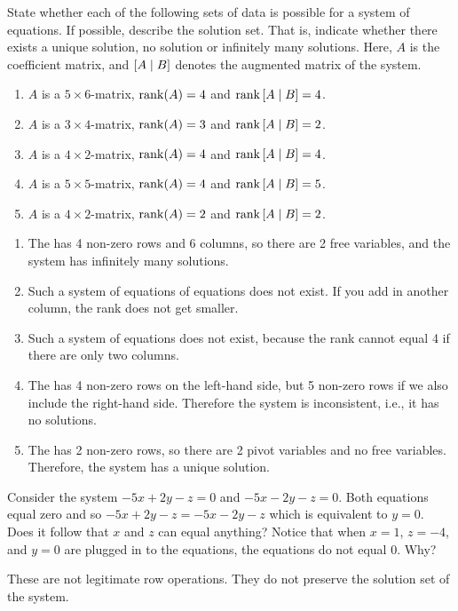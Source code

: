 \begin{ex}
  State whether each of the following sets of data is
  possible for a system of equations. If possible, describe the
  solution set.  That is, indicate whether there exists a unique
  solution, no solution or infinitely many solutions. Here, $A$ is
  the coefficient matrix, and $\left[A\mid B\right]$ denotes the
  augmented matrix of the system.

  \begin{enumerate}
  \item $A$ is a $5\times 6$-matrix, $\rank(A) =4$ and
    $\rank\mat{A\mid B} =4$.

  \item $A$ is a $3\times 4$-matrix, $\rank(A) =3$ and
    $\rank\mat{A\mid B} =2$.

  \item $A$ is a $4\times 2$-matrix, $\rank(A) =4$ and
    $\rank\mat{A\mid B} =4$.

  \item $A$ is a $5\times 5$-matrix, $\rank(A) =4$ and
    $\rank\mat{A\mid B} =5$.

  \item $A$ is a $4\times 2$-matrix, $\rank(A) =2$ and
    $\rank\mat{A\mid B} =2$.
  \end{enumerate}

  \begin{sol}
    \begin{enumerate}
    \item The {\ef} has 4 non-zero rows and 6 columns, so there are 2
      free variables, and the system has infinitely many solutions.
    \item Such a system of equations of equations does not exist. If
      you add in another column, the rank does not get smaller.
    \item Such a system of equations does not exist,
      because the rank cannot equal 4 if there are only two columns.
    \item The {\ef} has 4 non-zero rows on the left-hand side, but 5
      non-zero rows if we also include the right-hand side. Therefore
      the system is inconsistent, i.e., it has no solutions.
    \item The {\ef} has 2 non-zero rows, so there are 2
      pivot variables and no free variables. Therefore, the system has
      a unique solution.
    \end{enumerate}
  \end{sol}
\end{ex}

\begin{ex}
  Consider the system $-5x+2y-z=0$ and $-5x-2y-z=0$. Both equations
  equal zero and so $-5x+2y-z=-5x-2y-z$ which is equivalent to $y=0$. Does it follow that $x$
  and $z$ can equal anything?  Notice that when $x=1$, $z=-4$, and $y=0$ are plugged in
  to the equations, the equations do not equal $0$. Why?
  \begin{sol}
    These are not legitimate row
    operations. They do not preserve the solution set of the system.
  \end{sol}
\end{ex}
